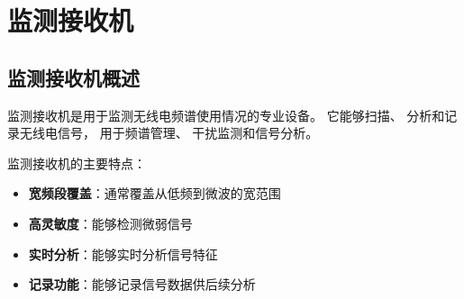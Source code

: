 
\chapter{监测接收机}
\label{chap:monitoring_receiver}

\section{监测接收机概述}
\label{sec:monitoring_receiver_intro}

监测接收机是用于监测无线电频谱使用情况的专业设备。
它能够扫描、
分析和记录无线电信号，
用于频谱管理、
干扰监测和信号分析。

监测接收机的主要特点：
\begin{itemize}
    \item \textbf{宽频段覆盖}：通常覆盖从低频到微波的宽范围
    \item \textbf{高灵敏度}：能够检测微弱信号
    \item \textbf{实时分析}：能够实时分析信号特征
    \item \textbf{记录功能}：能够记录信号数据供后续分析
\end{itemize}

